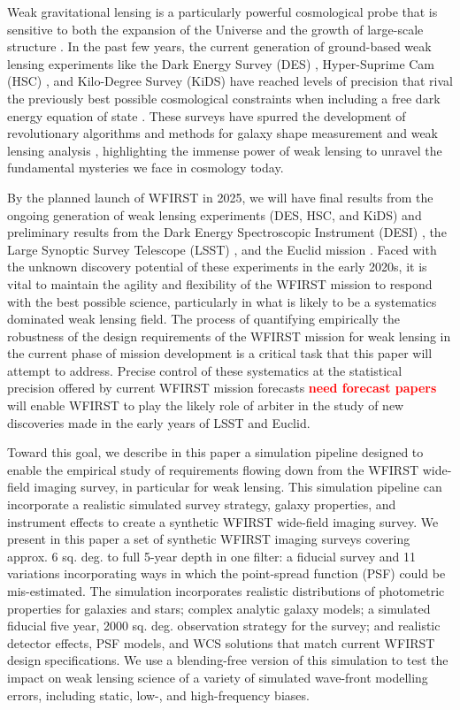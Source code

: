 \documentclass[aps,prd, amsmath,amssymb,superscriptaddress,showkeys,nofootinbib,reprint,preprintnumbers]{revtex4-1}
\newcommand{\verify}[1]{\textcolor{red}{\textbf{{#1}}}}
\begin{document}
Weak gravitational lensing is a particularly powerful cosmological probe that is sensitive to both the expansion of the Universe and the growth of large-scale structure \cite{2001PhR...340..291B,2017arXiv171003235M}. 
In the past few years, the current generation of ground-based weak lensing experiments like the Dark Energy Survey (DES) \cite{des}, Hyper-Suprime Cam (HSC) \cite{hsc}, and Kilo-Degree Survey (KiDS) \cite{kids} have reached levels of precision that rival the previously best possible cosmological constraints when including a free dark energy equation of state \cite{2018PhRvD..98d3528T,2019PASJ...71...43H,2018arXiv181206076H}. 
These surveys have spurred the development of revolutionary algorithms and methods for galaxy shape measurement and weak lensing analysis \cite{HuffMandelbaum2017,SheldonHuff2017,shearcat}, highlighting the immense power of weak lensing to unravel the fundamental mysteries we face in cosmology today. 

By the planned launch of WFIRST in 2025, we will have final results from the ongoing generation of weak lensing experiments (DES, HSC, and KiDS) and preliminary results from the Dark Energy Spectroscopic Instrument (DESI) \cite{desi}, the Large Synoptic Survey Telescope (LSST) \cite{lsst}, and the Euclid mission \cite{euclid}. 
Faced with the unknown discovery potential of these experiments in the early 2020s, it is vital to maintain the agility and flexibility of the WFIRST mission to respond with the best possible science, particularly in what is likely to be a systematics dominated weak lensing field.
The process of quantifying empirically the robustness of the design requirements of the WFIRST mission for weak lensing in the current phase of mission development is a critical task that this paper will attempt to address. 
Precise control of these systematics at the statistical precision offered by current WFIRST mission forecasts \cite{} \verify{need forecast papers} will enable WFIRST to play the likely role of arbiter in the study of new discoveries made in the early years of LSST and Euclid.

Toward this goal, we describe in this paper a simulation pipeline designed to enable the empirical study of requirements flowing down from the WFIRST wide-field imaging survey, in particular for weak lensing. This simulation pipeline can incorporate a realistic simulated survey strategy, galaxy properties, and instrument effects to create a synthetic WFIRST wide-field imaging survey. We present in this paper a set of synthetic WFIRST imaging surveys covering approx. 6 sq. deg. to full 5-year depth in one filter: a fiducial survey and 11 variations incorporating ways in which the point-spread function (PSF) could be mis-estimated. 
The simulation incorporates realistic distributions of photometric properties for galaxies and stars; complex analytic galaxy models; a simulated fiducial five year, 2000 sq. deg. observation strategy for the survey; and realistic detector effects, PSF models, and WCS solutions that match current WFIRST design specifications. 
We use a blending-free version of this simulation to test the impact on weak lensing science of a variety of simulated wave-front modelling errors, including static, low-, and high-frequency biases. 
\end{document}
